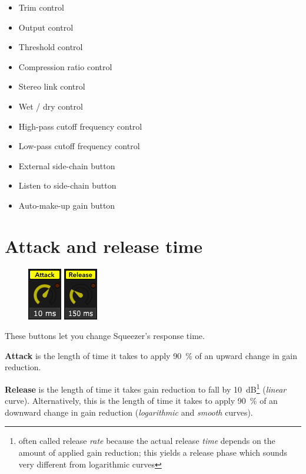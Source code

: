 \begin{itemize}
\item Trim control
\item Output control

\item Threshold control
\item Compression ratio control

\item Stereo link control
\item Wet / dry control

\item High-pass cutoff frequency control
\item Low-pass cutoff frequency control

\item External side-chain button
\item Listen to side-chain button

\item Auto-make-up gain button
\end{itemize}

\section{Attack and release time}

\begin{figure}
  \includegraphics[scale=\screenshotscale,clip]{include/images/knob_attack_time.png}
  \includegraphics[scale=\screenshotscale,clip]{include/images/knob_release_time.png}
\end{figure}

These buttons let you change Squeezer's response time.

\textbf{Attack} is the length of time it takes to apply
\SI{90}{\percent} of an upward change in gain reduction.

\textbf{Release} is the length of time it takes gain reduction to fall
by \SI{10}{\dB}\footnote{often called release \emph{rate} because the
  actual release \emph{time} depends on the amount of applied gain
  reduction; this yields a release phase which sounds very different
  from logarithmic curves} (\emph{linear} curve).  Alternatively, this
is the length of time it takes to apply \SI{90}{\percent} of an
downward change in gain reduction (\emph{logarithmic} and
\emph{smooth} curves).


